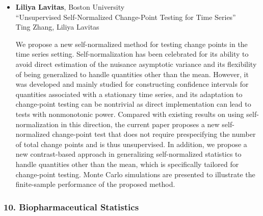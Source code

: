 \begin{itemize}
\item \textbf{Liliya Lavitas}, Boston University \\
``Unsupervised Self-Normalized Change-Point Testing for Time Series'' \\
Ting Zhang, Liliya Lavitas


We propose a new self-normalized method for testing change points in the time series setting. Self-normalization has been celebrated for its ability to avoid direct estimation of the nuisance asymptotic variance and its flexibility of being generalized to handle quantities other than the mean. However, it was developed and mainly studied for constructing confidence intervals for quantities associated with a stationary time series, and its adaptation to change-point testing can be nontrivial as direct implementation can lead to tests with nonmonotonic power. Compared with existing results on using self-normalization in this direction, the current paper proposes a new self-normalized change-point test that does not require prespecifying the number of total change points and is thus unsupervised. In addition, we propose a new contrast-based approach in generalizing self-normalized statistics to handle quantities other than the mean, which is specifically tailored for change-point testing. Monte Carlo simulations are presented to illustrate the finite-sample performance of the proposed method.

\end{itemize}

\subsubsection*{10. Biopharmaceutical Statistics}


